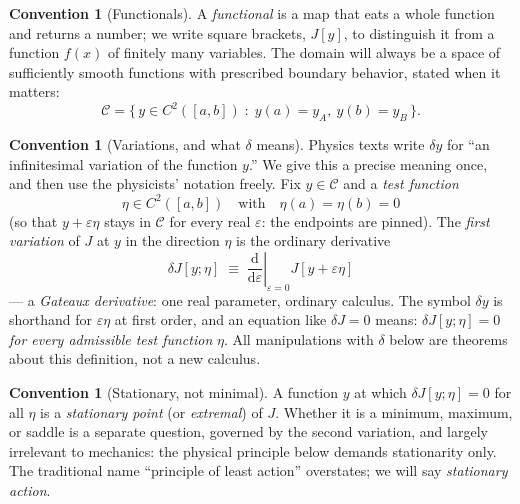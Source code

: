 \documentclass[11pt]{article}
\theoremstyle{plain}
\theoremstyle{definition}
\newtheorem{convention}[theorem]{Convention}
\theoremstyle{remark}
\newcommand{\dd}{\mathrm{d}}
\begin{document}
\begin{convention}[Functionals]\label{conv:functional}
A \emph{functional} is a map that eats a whole function and returns a
number; we write square brackets, $J[y]$, to distinguish it from a function
$f(x)$ of finitely many variables. The domain will always be a space of
sufficiently smooth functions with prescribed boundary behavior, stated
when it matters:
\begin{equation}
  \mathcal{C} = \bigl\{\, y \in C^2([a,b]) \;:\; y(a) = y_A,\ y(b) = y_B \,\bigr\}.
\end{equation}
\end{convention}

\begin{convention}[Variations, and what $\delta$ means]\label{conv:delta}
Physics texts write $\delta y$ for ``an infinitesimal variation of the
function $y$.'' We give this a precise meaning once, and then use the
physicists' notation freely. Fix $y \in \mathcal{C}$ and a \emph{test
function}
\begin{equation}
  \eta \in C^2([a,b]) \quad\text{with}\quad \eta(a) = \eta(b) = 0
\end{equation}
(so that $y + \varepsilon\eta$ stays in $\mathcal{C}$ for every real
$\varepsilon$: the endpoints are pinned). The \emph{first variation} of $J$
at $y$ in the direction $\eta$ is the ordinary derivative
\begin{equation}
  \delta J[y;\eta]
  \;\equiv\;
  \left.\frac{\dd}{\dd\varepsilon}\right|_{\varepsilon=0}
  J[y + \varepsilon\eta]
\end{equation}
--- a \emph{Gateaux derivative}: one real parameter, ordinary calculus. The
symbol $\delta y$ is shorthand for $\varepsilon\eta$ at first order, and an
equation like $\delta J = 0$ means: $\delta J[y;\eta] = 0$ \emph{for every
admissible test function} $\eta$. All manipulations with $\delta$ below are
theorems about this definition, not a new calculus.
\end{convention}

\begin{convention}[Stationary, not minimal]\label{conv:stationary}
A function $y$ at which $\delta J[y;\eta]=0$ for all $\eta$ is a
\emph{stationary point} (or \emph{extremal}) of $J$. Whether it is a
minimum, maximum, or saddle is a separate question, governed by the second
variation, and largely irrelevant to mechanics: the physical principle
below demands stationarity only. The traditional name ``principle of least
action'' overstates; we will say \emph{stationary action}.
\end{convention}
\end{document}

